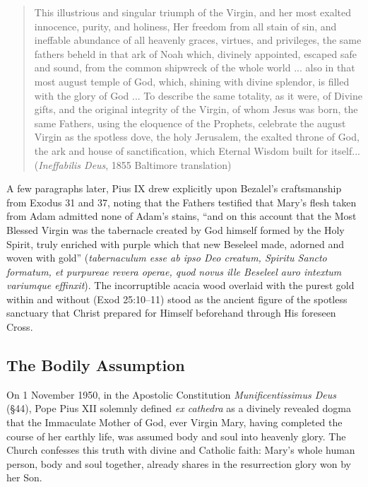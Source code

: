 \begin{quote}\small
This illustrious and singular triumph of the Virgin, and her most exalted innocence, purity, and holiness, Her freedom from all stain of sin, and ineffable abundance of all heavenly graces, virtues, and privileges, the same fathers beheld in that ark of Noah which, divinely appointed, escaped safe and sound, from the common shipwreck of the whole world ... also in that most august temple of God, which, shining with divine splendor, is filled with the glory of God ... To describe the same totality, as it were, of Divine gifts, and the original integrity of the Virgin, of whom Jesus was born, the same Fathers, using the eloquence of the Prophets, celebrate the august Virgin as the spotless dove, the holy Jerusalem, the exalted throne of God, the ark and house of sanctification, which Eternal Wisdom built for itself... (\textit{Ineffabilis Deus}, 1855 Baltimore translation)
\end{quote}

A few paragraphs later, Pius IX drew explicitly upon Bezalel's craftsmanship from Exodus 31 and 37, noting that the Fathers testified that Mary's flesh taken from Adam admitted none of Adam's stains, ``and on this account that the Most Blessed Virgin was the tabernacle created by God himself formed by the Holy Spirit, truly enriched with purple which that new Beseleel made, adorned and woven with gold'' (\textit{tabernaculum esse ab ipso Deo creatum, Spiritu Sancto formatum, et purpureae revera operae, quod novus ille Beseleel auro intextum variumque effinxit}). The incorruptible acacia wood overlaid with the purest gold within and without (Exod 25:10--11) stood as the ancient figure of the spotless sanctuary that Christ prepared for Himself beforehand through His foreseen Cross.

\subsection{The Bodily Assumption}\label{subsec:bodily-assumption}

On 1 November 1950, in the Apostolic Constitution \textit{Munificentissimus Deus} (\S 44), Pope Pius XII solemnly defined \textit{ex cathedra} as a divinely revealed dogma that the Immaculate Mother of God, ever Virgin Mary, having completed the course of her earthly life, was assumed body and soul into heavenly glory. The Church confesses this truth with divine and Catholic faith: Mary's whole human person, body and soul together, already shares in the resurrection glory won by her Son.

